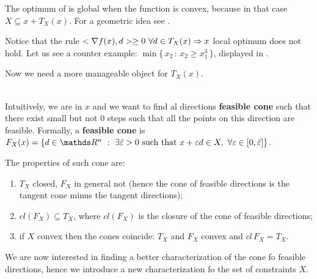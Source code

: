 \documentclass[ComputationalMathematics.tex]{subfiles}
\begin{document}
\begin{obs}
  The optimum of  is global when the function is convex, because in that case $X \subseteq x + T_X(x)$. For a geometric idea see .
\end{obs}

\begin{obs}
  Notice that the rule  $<\nabla f(x), d> \geq 0~\forall d \in T_X(x) \Rightarrow x$ local optimum does not hold. Let us see a counter example: $\min \{ \, x_2 \,:\, x_2 \geq x_1^3 \, \}$, displayed in .

\end{obs}

Now we need a more manageable object for $T_X(x)$.

\begin{definition}~\\
  Intuitively, we are in $x$ and we want to find al directions \textbf{feasible cone} such that there exist small but not $0$ steps such that all the points on this direction are feasible.
  Formally, a \textbf{feasible cone} is $F_X(x) = \{ d \in \R^n~:~ \exists \bar{\varepsilon} > 0 \text{ such that } x + \varepsilon d \in X, ~ \forall \varepsilon \in [0, \bar{\varepsilon}]\}$.
\end{definition}

\begin{proposition}
The properties of such cone are:
  \begin{enumerate}
    \item $T_X$ closed, $F_X$ in general not (hence the cone of feasible directions is the tangent cone minus the tangent directions);
    \item $cl(F_X) \subseteq T_X$, where $cl(F_X)$ is the closure of the cone of feasible directions;
    \item if $X$ convex then the cones coincide: $T_X$ and $F_X$ convex and $cl \, F_X = T_X$.
  \end{enumerate}
\end{proposition}

We are now interested in finding a better characterization of the cone fo feasible directions, hence we introduce a new characterization fo the set of constraints $X$.
\end{document}
